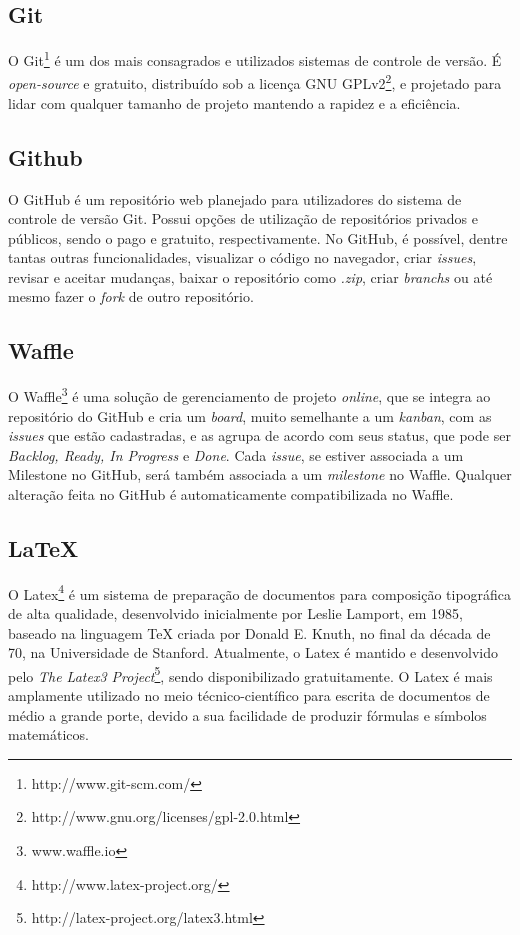 \subsection{Git}
O Git\footnote{http://www.git-scm.com/} é um dos mais consagrados e utilizados sistemas de controle de versão. É \textit{open-source} e gratuito, distribuído sob a licença GNU GPLv2\footnote{http://www.gnu.org/licenses/gpl-2.0.html}, e projetado para lidar com qualquer tamanho de projeto mantendo a rapidez e a eficiência. 

\subsection{Github}
O GitHub é um repositório web planejado para utilizadores do sistema de controle de versão Git. Possui opções de utilização de repositórios privados e públicos, sendo o pago e gratuito, respectivamente.
No GitHub, é possível, dentre tantas outras funcionalidades, visualizar o código no navegador, criar \textit{issues}, revisar e aceitar mudanças, baixar o repositório como \textit{.zip}, criar \textit{branchs} ou até mesmo fazer o \textit{fork} de outro repositório.

\subsection{Waffle}
O Waffle\footnote{www.waffle.io} é uma solução de gerenciamento de projeto \textit{online}, que se integra ao repositório do GitHub e cria um \textit{board}, muito semelhante a um \textit{kanban}, com as \textit{issues} que estão cadastradas, e as agrupa de acordo com seus status, que pode ser \textit{Backlog, Ready, In Progress}  e \textit{Done}. Cada \textit{issue}, se estiver associada a um Milestone no GitHub, será também associada a um \textit{milestone} no Waffle. Qualquer alteração feita no GitHub é automaticamente compatibilizada no Waffle.

\subsection{LaTeX}
O Latex\footnote{http://www.latex-project.org/} é um sistema de preparação de documentos para composição tipográfica de alta qualidade, desenvolvido inicialmente por Leslie Lamport, em 1985, baseado na linguagem TeX criada por Donald E. Knuth, no final da década de 70, na Universidade de Stanford. Atualmente, o Latex é mantido e desenvolvido pelo \textit{The Latex3 Project}\footnote{http://latex-project.org/latex3.html}, sendo disponibilizado gratuitamente.
O Latex é mais amplamente utilizado no meio técnico-científico para escrita de documentos de médio a grande porte, devido a sua facilidade de produzir fórmulas e símbolos matemáticos. 

